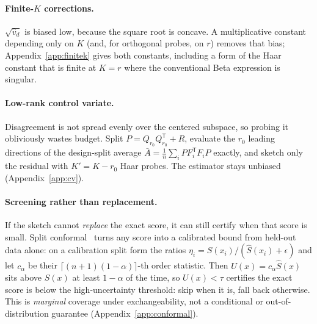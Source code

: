 \documentclass{article}
\begin{document}
\paragraph{Finite-$K$ corrections.}
$\sqrt{\widehat v_d}$ is biased low, because the square root is concave. A multiplicative constant
depending only on $K$ (and, for orthogonal probes, on $r$) removes that bias; Appendix~\ref{app:finitek}
gives both constants, including a form of the Haar constant that is finite at $K=r$ where the
conventional Beta expression is singular.

\paragraph{Low-rank control variate.}
Disagreement is not spread evenly over the centered subspace, so probing it obliviously wastes
budget. Split $P=Q_{r_0}Q_{r_0}^{\mathsf T}+R$, evaluate the $r_0$ leading directions of the
design-split average $\bar A=\frac1n\sum_i PF_i^{\mathsf T}F_iP$ exactly, and sketch only the residual
with $K'=K-r_0$ Haar probes. The estimator stays unbiased (Appendix~\ref{app:cv}).

\paragraph{Screening rather than replacement.}
If the sketch cannot \emph{replace} the exact score, it can still certify when that score is small.
Split conformal~\citep{vovk2005,crc} turns any score into a calibrated bound from held-out data
alone: on a calibration split form the ratios $\eta_i=S(x_i)/(\widehat S(x_i)+\epsilon)$ and let
$c_\alpha$ be their $\lceil (n+1)(1-\alpha)\rceil$-th order statistic. Then $U(x)=c_\alpha\widehat S(x)$
sits above $S(x)$ at least $1-\alpha$ of the time, so $U(x)<\tau$ certifies the exact score is below
the high-uncertainty threshold: skip when it is, fall back otherwise. This is \emph{marginal}
coverage under exchangeability, not a conditional or out-of-distribution guarantee
(Appendix~\ref{app:conformal}).
\end{document}
